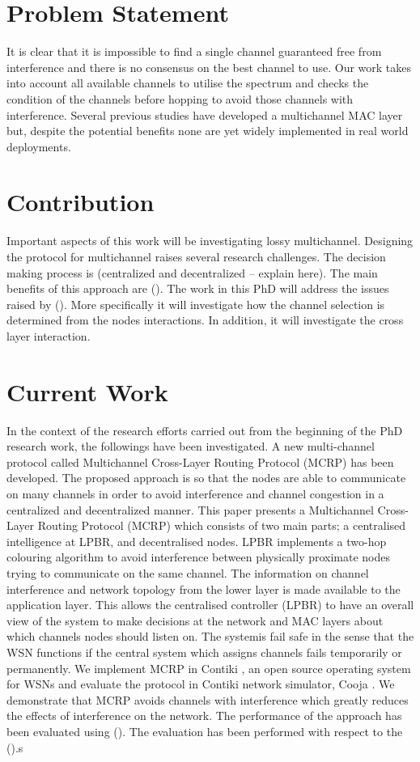 \section{Problem Statement}
It is clear that it is impossible to find a single channel guaranteed free from interference and there is no consensus on the best channel to use. Our work takes into account all available channels to utilise the spectrum and checks the condition of the channels before hopping to avoid those channels with interference. Several previous studies have developed a multichannel MAC layer but, despite the potential benefits none are yet widely implemented in real world deployments.

\section{Contribution}
Important aspects of this work will be investigating lossy multichannel. Designing the protocol for multichannel raises several research challenges. The decision making process is (centralized and decentralized – explain here). The main benefits of this approach are (). 
The work in this PhD will address the issues raised by (). More specifically it will investigate how the channel selection is determined from the nodes interactions. In addition, it will investigate the cross layer interaction. 

\section{Current Work}
In the context of the research efforts carried out from the beginning of the PhD research work, the followings have been investigated.
A new multi-channel protocol called Multichannel Cross-Layer Routing Protocol (MCRP) has been developed. The proposed approach is so that the nodes are able to communicate on many channels in order to avoid interference and channel congestion in a centralized and decentralized manner.
This paper presents a Multichannel Cross-Layer Routing Protocol (MCRP) which consists of two main parts; a centralised intelligence at LPBR, and decentralised nodes. LPBR implements a two-hop colouring algorithm to avoid interference between physically proximate nodes trying to communicate on the same channel. The information on channel interference and network topology from the lower layer is made available to the application layer. This allows the centralised controller (LPBR) to have an overall view of the system to make decisions at the network and MAC layers about which channels nodes should listen on. The systemis fail safe in the sense that the WSN functions if the central system which assigns channels fails temporarily or permanently. We implement MCRP in Contiki \cite{contiki}, an open source operating system for WSNs and evaluate the protocol in Contiki network simulator, Cooja \cite{cooja}. 
We demonstrate that MCRP avoids channels with interference which greatly reduces the effects of interference on the network.
The performance of the approach has been evaluated using (). The evaluation has been performed with respect to the ().s


